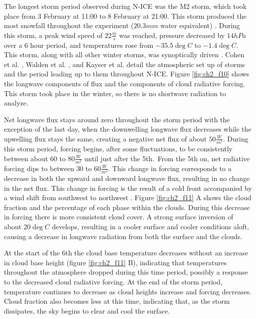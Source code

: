 The longest storm period observed during N-ICE was the M2 storm, which took place from 3 February at 11:00 to 8 February at 21:00. This storm produced the most snowfall throughout the experiment ($20.3 mm$ water equivalent) \cite{cohen:2017}. During this storm, a peak wind speed of $22 \frac{m}{s}$ was reached, pressure decreased by $14 hPa$ over a 6 hour period, and temperatures rose from $-35.5 \deg C$ to $-1.4 \deg C$. This storm, along with all other winter storms, was synoptically driven \cite{cohen:2017}. Cohen et al. \cite{cohen:2017}, Walden et al. \cite{walden:2017}, and Kayser et al. \cite{kayser:2017} detail the atmospheric set up of storms and the period leading up to them throughout N-ICE. Figure \ref{fig:ch2_f10} shows the longwave components of flux and the components of cloud radiative forcing. This storm took place in the winter, so there is no shortwave radiation to analyze. 

Net longwave flux stays around zero throughout the storm period with the exception of the last day, when the downwelling longwave flux decreases while the upwelling flux stays the same, creating a negative net flux of about $50 \frac{W}{m^{2}}$. During this storm period, forcing begins, after some fluctuations, to be consistently between about $60$ to $80 \frac{W}{m^{2}}$ until just after the 5th. From the 5th on, net radiative forcing dips to between $30$ to $60 \frac{W}{m^{2}}$. This change in forcing corresponds to a decrease in both the upward and downward longwave flux, resulting in no change in the net flux. This change in forcing is the result of a cold front accompanied by a wind shift from southwest to northwest \cite{kayser:2017}. Figure \ref{fig:ch2_f11} A shows the cloud fraction and the percentage of each phase within the clouds. During this decrease in forcing there is more consistent cloud cover. A strong surface inversion of about $20 \deg C$ develops, resulting in a cooler surface and cooler conditions aloft, causing a decrease in longwave radiation from both the surface and the clouds. 

At the start of the 6th the cloud base temperature decreases without an increase in cloud base height (figure \ref{fig:ch2_f11} B), indicating that temperatures throughout the atmosphere dropped during this time period, possibly a response to the decreased cloud radiative forcing. At the end of the storm period, temperature continues to decrease as cloud heights increase and forcing decreases. Cloud fraction also becomes less at this time, indicating that, as the storm dissipates, the sky begins to clear and cool the surface. 

